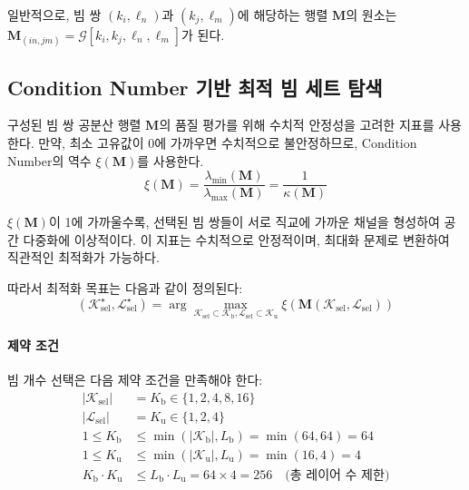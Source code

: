 \documentclass[10pt]{article}
\begin{document}
일반적으로, 빔 쌍 $(k_i, \ell_n)$과 $(k_j, \ell_m)$에 해당하는 행렬 $\mathbf{M}$의 원소는 $\mathbf{M}_{(in, jm)} = \mathcal{G}[k_i, k_j, \ell_n, \ell_m]$가 된다.

\subsection{Condition Number 기반 최적 빔 세트 탐색}
\label{subsec:condition_number_search}
구성된 빔 쌍 공분산 행렬 $\mathbf{M}$의 품질 평가를 위해 수치적 안정성을 고려한 지표를 사용한다. 만약, 최소 고유값이 0에 가까우면 수치적으로 불안정하므로, Condition Number의 역수 $\xi(\mathbf{M})$를 사용한다.
\begin{equation}
\xi(\mathbf{M}) = \frac{\lambda_{\min}(\mathbf{M})}{\lambda_{\max}(\mathbf{M})} = \frac{1}{\kappa(\mathbf{M})}
\end{equation}

$\xi(\mathbf{M})$이 1에 가까울수록, 선택된 빔 쌍들이 서로 직교에 가까운 채널을 형성하여 공간 다중화에 이상적이다. 이 지표는 수치적으로 안정적이며, 최대화 문제로 변환하여 직관적인 최적화가 가능하다.

따라서 최적화 목표는 다음과 같이 정의된다:
\begin{equation}
(\mathcal{K}_{\text{sel}}^{\star}, \mathcal{L}_{\text{sel}}^{\star}) = \arg\max_{\mathcal{K}_{\text{sel}} \subset \mathcal{K}_{\text{b}}, \mathcal{L}_{\text{sel}} \subset \mathcal{K}_{\text{u}}} \xi(\mathbf{M}(\mathcal{K}_{\text{sel}}, \mathcal{L}_{\text{sel}}))
\end{equation}

\paragraph{제약 조건}
빔 개수 선택은 다음 제약 조건을 만족해야 한다:
\begin{align}
|\mathcal{K}_{\text{sel}}| &= K_{\text{b}} \in \{1, 2, 4, 8, 16\} \\
|\mathcal{L}_{\text{sel}}| &= K_{\text{u}} \in \{1, 2, 4\} \\
1 \leq K_{\text{b}} &\leq \min(|\mathcal{K}_{\text{b}}|, L_{\text{b}}) = \min(64, 64) = 64 \\
1 \leq K_{\text{u}} &\leq \min(|\mathcal{K}_{\text{u}}|, L_{\text{u}}) = \min(16, 4) = 4 \\
K_{\text{b}} \cdot K_{\text{u}} &\leq L_{\text{b}} \cdot L_{\text{u}} = 64 \times 4 = 256 \quad \text{(총 레이어 수 제한)}
\end{align}
\end{document}
